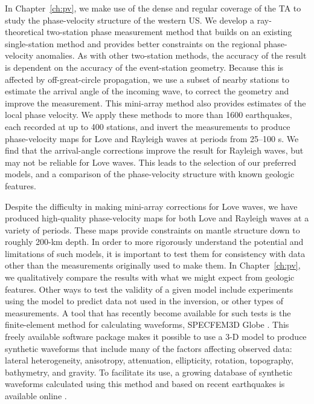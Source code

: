 \documentclass[12pt,oneside]{book}
\begin{document}
In Chapter~\ref{ch:pv}, we make use of the dense and regular coverage of the TA to study the phase-velocity structure of the western US. We develop a ray-theoretical two-station phase measurement method that builds on an existing single-station method and provides better constraints on the regional phase-velocity anomalies. As with other two-station methods, the accuracy of the result is dependent on the accuracy of the event-station geometry. Because this is affected by off-great-circle propagation, we use a subset of nearby stations to estimate the arrival angle of the incoming wave, to correct the geometry and improve the measurement. This mini-array method also provides estimates of the local phase velocity. We apply these methods to more than 1600 earthquakes, each recorded at up to 400 stations, and invert the measurements to produce phase-velocity maps for Love and Rayleigh waves at periods from 25--100 s. We find that the arrival-angle corrections improve the result for Rayleigh waves, but may not be reliable for Love waves. This leads to the selection of our preferred models, and a comparison of the phase-velocity structure with known geologic features.

Despite the difficulty in making mini-array corrections for Love waves, we have produced high-quality phase-velocity maps for both Love and Rayleigh waves at a variety of periods. These maps provide constraints on mantle structure down to roughly 200-km depth. In order to more rigorously understand the potential and limitations of such models, it is important to test them for consistency with data other than the measurements originally used to make them. In Chapter~\ref{ch:pv}, we qualitatively compare the results with what we might expect from geologic features. Other ways to test the validity of a given model include experiments using the model to predict data not used in the inversion, or other types of measurements. A tool that has recently become available for such tests is the finite-element method for calculating waveforms, SPECFEM3D Globe \citep{KomatitschTromp2002a, KomatitschTromp2002b}. This freely available software package makes it possible to use a 3\nobreakdash-D model to produce synthetic waveforms that include many of the factors affecting observed data: lateral heterogeneity, anisotropy, attenuation, ellipticity, rotation, topography, bathymetry, and gravity. To facilitate its use, a growing database of synthetic waveforms calculated using this method and based on recent earthquakes is available online \citep{Tromp2010}. 
\end{document}
